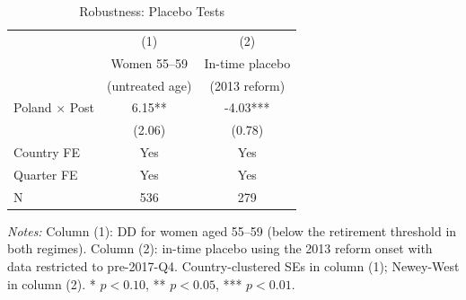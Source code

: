 \begin{table}[H]
\centering
\caption{Robustness: Placebo Tests}
\label{tab:robustness}
\begin{threeparttable}
\begin{tabular}{lcc}
\toprule
 & (1) & (2) \\
 & Women 55--59 & In-time placebo \\
 & (untreated age) & (2013 reform) \\
\midrule
Poland $\times$ Post & 6.15** & -4.03*** \\
 & (2.06) & (0.78) \\
[0.3em]
Country FE & Yes & Yes \\
Quarter FE & Yes & Yes \\
N & 536 & 279 \\
\bottomrule
\end{tabular}
\begin{tablenotes}[flushleft]
\small
\item \textit{Notes:} Column (1): DD for women aged 55--59 (below the retirement threshold in both regimes). Column (2): in-time placebo using the 2013 reform onset with data restricted to pre-2017-Q4. Country-clustered SEs in column (1); Newey-West in column (2). * $p<0.10$, ** $p<0.05$, *** $p<0.01$.
\end{tablenotes}
\end{threeparttable}
\end{table}
